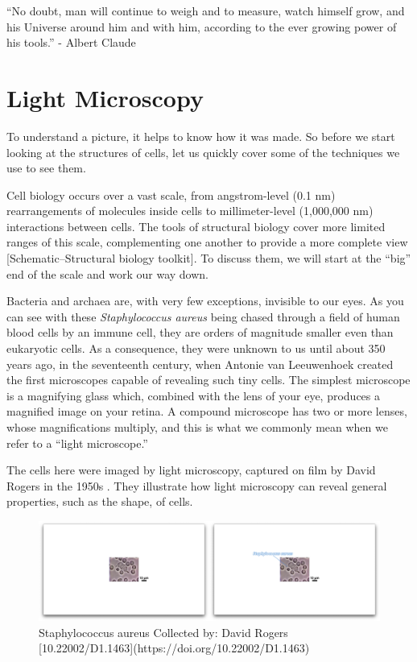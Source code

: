 \documentclass[]{tufte-book}
\begin{document}
``No doubt, man will continue to weigh and to measure, watch himself
grow, and his Universe around him and with him, according to the ever
growing power of his tools.'' - Albert Claude \citet{claude1974}

\section{Light Microscopy}\label{light-microscopy}

To understand a picture, it helps to know how it was made. So before we
start looking at the structures of cells, let us quickly cover some of
the techniques we use to see them.

Cell biology occurs over a vast scale, from angstrom-level (0.1 nm)
rearrangements of molecules inside cells to millimeter-level (1,000,000
nm) interactions between cells. The tools of structural biology cover
more limited ranges of this scale, complementing one another to provide
a more complete view {[}Schematic--Structural biology toolkit{]}. To
discuss them, we will start at the ``big'' end of the scale and work our
way down.

Bacteria and archaea are, with very few exceptions, invisible to our
eyes. As you can see with these \emph{Staphylococcus aureus} being
chased through a field of human blood cells by an immune cell, they are
orders of magnitude smaller even than eukaryotic cells. As a
consequence, they were unknown to us until about 350 years ago, in the
seventeenth century, when Antonie van Leeuwenhoek created the first
microscopes capable of revealing such tiny cells. The simplest
microscope is a magnifying glass which, combined with the lens of your
eye, produces a magnified image on your retina. A compound microscope
has two or more lenses, whose magnifications multiply, and this is what
we commonly mean when we refer to a ``light microscope.''

The cells here were imaged by light microscopy, captured on film by
David Rogers in the 1950s \citet{hill}. They illustrate how light
microscopy can reveal general properties, such as the shape, of cells.

\begin{figure}
\includegraphics{movie_stills/1_1} \caption[Staphylococcus aureus Collected by]{Staphylococcus aureus Collected by: David Rogers [10.22002/D1.1463](https://doi.org/10.22002/D1.1463)}\label{fig:unnamed-chunk-2}
\end{figure}
\end{document}
